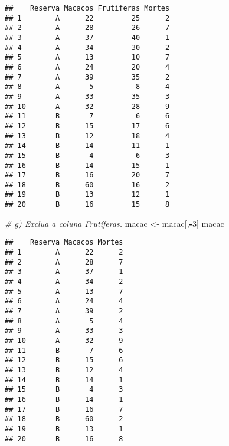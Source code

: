 \documentclass[]{article}
\newenvironment{Shaded}{\begin{snugshade}}{\end{snugshade}}
\newcommand{\CommentTok}[1]{\textcolor[rgb]{0.56,0.35,0.01}{\textit{#1}}}
\newcommand{\DecValTok}[1]{\textcolor[rgb]{0.00,0.00,0.81}{#1}}
\newcommand{\KeywordTok}[1]{\textcolor[rgb]{0.13,0.29,0.53}{\textbf{#1}}}
\newcommand{\NormalTok}[1]{#1}
\newcommand{\OperatorTok}[1]{\textcolor[rgb]{0.81,0.36,0.00}{\textbf{#1}}}
\newcommand{\StringTok}[1]{\textcolor[rgb]{0.31,0.60,0.02}{#1}}
\begin{document}
\begin{verbatim}
##    Reserva Macacos Frutíferas Mortes
## 1        A      22         25      2
## 2        A      28         26      7
## 3        A      37         40      1
## 4        A      34         30      2
## 5        A      13         10      7
## 6        A      24         20      4
## 7        A      39         35      2
## 8        A       5          8      4
## 9        A      33         35      3
## 10       A      32         28      9
## 11       B       7          6      6
## 12       B      15         17      6
## 13       B      12         18      4
## 14       B      14         11      1
## 15       B       4          6      3
## 16       B      14         15      1
## 17       B      16         20      7
## 18       B      60         16      2
## 19       B      13         12      1
## 20       B      16         15      8
\end{verbatim}

\begin{Shaded}
\begin{Highlighting}[]
\CommentTok{# g) Exclua a coluna Frutíferas.}
\NormalTok{macac <-}\StringTok{ }\NormalTok{macac[,}\OperatorTok{-}\DecValTok{3}\NormalTok{]}
\NormalTok{macac}
\end{Highlighting}
\end{Shaded}

\begin{verbatim}
##    Reserva Macacos Mortes
## 1        A      22      2
## 2        A      28      7
## 3        A      37      1
## 4        A      34      2
## 5        A      13      7
## 6        A      24      4
## 7        A      39      2
## 8        A       5      4
## 9        A      33      3
## 10       A      32      9
## 11       B       7      6
## 12       B      15      6
## 13       B      12      4
## 14       B      14      1
## 15       B       4      3
## 16       B      14      1
## 17       B      16      7
## 18       B      60      2
## 19       B      13      1
## 20       B      16      8
\end{verbatim}

\begin{Shaded}
\end{Shaded}
\end{document}
